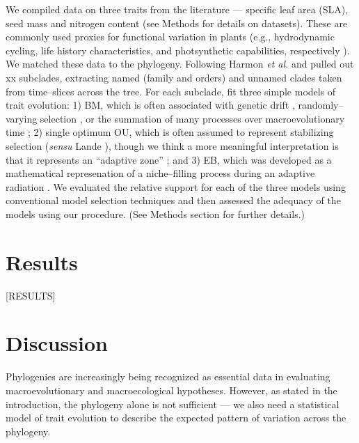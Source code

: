 \documentclass[a4paper,12pt]{article}
\begin{document}
We compiled data on three traits from the literature --- specific leaf area (SLA), seed mass and nitrogen content (see Methods for details on datasets). These are commonly used proxies for functional variation in plants (e.g., hydrodynamic cycling, life history characteristics, and photsynthetic capabilities, respectively \citep{Westoby2002}). We  matched these data to the phylogeny. Following Harmon \textit{et al.} \citep{Harmon2010} and pulled out xx subclades, extracting named (family and orders) and unnamed clades taken from time--slices across the tree. For each subclade, fit three simple models of trait evolution: 1) BM, which is often associated with genetic drift \citep{Lande1976, Felsenstein1988, Lynch1990, HansenMartins1996}, randomly--varying selection \citep{Felsenstein1973}, or the summation of many processes over macroevolutionary time \citep{HansenMartins1996, Uyeda2011, PennellPE}; 2) single optimum OU, which is often assumed to represent stabilizing selection (\textit{sensu} Lande \citep{Lande1976}), though we think a more meaningful interpretation is that it represents an ``adaptive zone'' \citep{Arnold2001, Hansen2012book PennellHarmon}; and 3) EB, which was developed as a mathematical represenation of a niche--filling process during an adaptive radiation \citep{Harmon2010, SlaterPennell}. We evaluated the relative support for each of the three models using conventional model selection techniques and then assessed the adequacy of the models using our procedure. (See Methods section for further details.) 

\section{Results}

[RESULTS]

\section{Discussion}

Phylogenies are increasingly being recognized as essential data in evaluating macroevolutionary and macroecological hypotheses. However, as stated in the introduction, the phylogeny alone is not sufficient --- we also need a statistical model of trait evolution to describe the expected pattern of variation across the phylogeny. 
\end{document}
